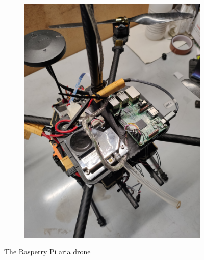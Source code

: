 \begin{figure}[!ht]
    \begin{subfigure}[b]{0.45\textwidth}
        \centering
        \includegraphics[width=\textwidth, angle=-90]{images/drone/IMG_20211105_103839.jpg}
        \caption{}
        \label{fig:rasp}
    \end{subfigure}
       \caption{The Rasperry Pi \gls{aria} drone}
       \label{fig:system}
\end{figure}
